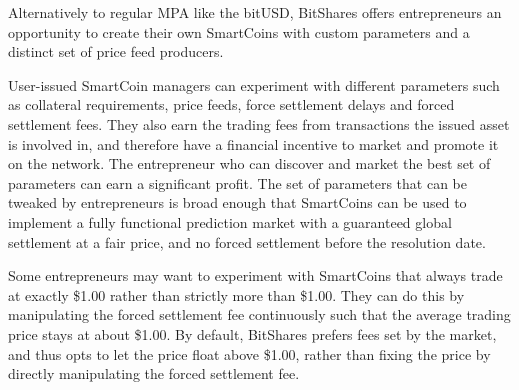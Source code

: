 Alternatively to regular MPA like the bitUSD, BitShares offers entrepreneurs an
opportunity to create their own SmartCoins with custom parameters and a
distinct set of price feed producers.

User-issued SmartCoin managers can experiment with different parameters such as
collateral requirements, price feeds, force settlement delays and forced
settlement fees. They also earn the trading fees from transactions the issued
asset is involved in, and therefore have a financial incentive to market and
promote it on the network. The entrepreneur who can discover and market the
best set of parameters can earn a significant profit. The set of parameters
that can be tweaked by entrepreneurs is broad enough that SmartCoins can be
used to implement a fully functional prediction market with a guaranteed global
settlement at a fair price, and no forced settlement before the resolution
date.

Some entrepreneurs may want to experiment with SmartCoins that always trade at
exactly \$1.00 rather than strictly more than \$1.00. They can do this by
manipulating the forced settlement fee continuously such that the average
trading price stays at about \$1.00. By default, BitShares prefers fees set by
the market, and thus opts to let the price float above \$1.00, rather than
fixing the price by directly manipulating the forced settlement fee.
